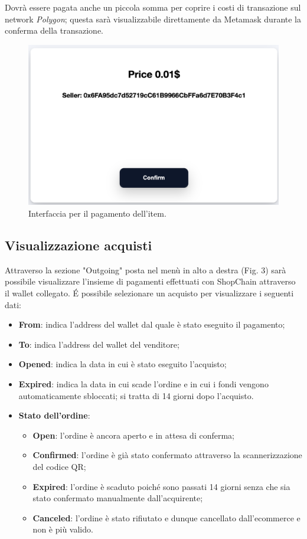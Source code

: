 \documentclass[a4paper, 12pt]{article}
\begin{document}
Dovrà essere pagata anche un piccola somma per coprire i costi di transazione sul network \textit{Polygon}; questa sarà visualizzabile direttamente da Metamask durante la conferma della transazione.

\FloatBarrier
\begin{figure}
\centering
\includegraphics[width=0.5\linewidth]{img/oggetto_in_vendita.png}
\caption{Interfaccia per il pagamento dell'item.}
\end{figure}
\FloatBarrier

\subsection{Visualizzazione acquisti}
Attraverso la sezione "Outgoing" posta nel menù in alto a destra (Fig. 3) sarà possibile visualizzare l'insieme di pagamenti effettuati con ShopChain attraverso il wallet collegato.
É possibile selezionare un acquisto per visualizzare i seguenti dati:
\begin{itemize}
\item \textbf{From}: indica l'address del wallet dal quale è stato eseguito il pagamento;
\item \textbf{To}: indica l'address del wallet del venditore;
\item \textbf{Opened}: indica la data in cui è stato eseguito l'acquisto;
\item \textbf{Expired}: indica la data in cui scade l'ordine e in cui i fondi vengono automaticamente sbloccati; si tratta di 14 giorni dopo l'acquisto.
\item \textbf{Stato dell'ordine}:
  \begin{itemize}
    \item \textbf{Open}: l'ordine è ancora aperto e in attesa di conferma;
    \item \textbf{Confirmed}: l'ordine è già stato confermato attraverso la scannerizzazione del codice QR;
    \item \textbf{Expired}: l'ordine è scaduto poiché sono passati 14 giorni senza che sia stato confermato manualmente dall'acquirente;
    \item \textbf{Canceled}: l'ordine è stato rifiutato e dunque cancellato dall'ecommerce e non è più valido.
  \end{itemize}
\end{itemize}
\end{document}
